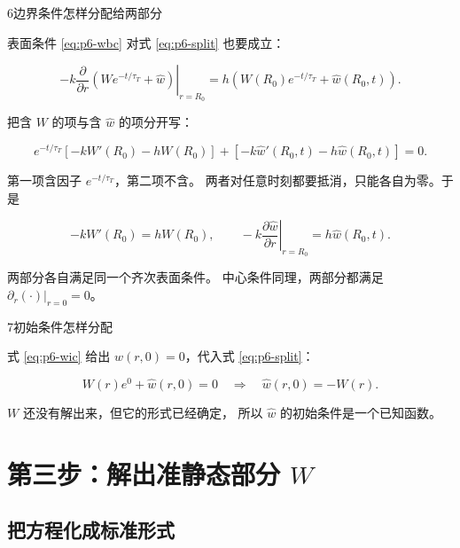 \begin{stepbox}{6}{边界条件怎样分配给两部分}

表面条件 \eqref{eq:p6-wbc} 对式 \eqref{eq:p6-split} 也要成立：

\begin{equation}
-k\left.\frac{\partial}{\partial r}\left(W e^{-t/\tau_T}+\hat w\right)\right|_{r=R_0}
=h\left(W(R_0)e^{-t/\tau_T}+\hat w(R_0,t)\right).
\end{equation}

把含 $W$ 的项与含 $\hat w$ 的项分开写：

\begin{equation}
e^{-t/\tau_T}\left[-kW'(R_0)-hW(R_0)\right]
+\left[-k\hat w'(R_0,t)-h\hat w(R_0,t)\right]=0 .
\end{equation}

第一项含因子 $e^{-t/\tau_T}$，第二项不含。
两者对任意时刻都要抵消，只能各自为零。于是

\begin{equation}
-kW'(R_0)=hW(R_0),
\qquad
-k\left.\frac{\partial\hat w}{\partial r}\right|_{r=R_0}=h\hat w(R_0,t).
\label{eq:p6-splitbc}
\end{equation}

两部分各自满足同一个齐次表面条件。
中心条件同理，两部分都满足 $\partial_r(\cdot)|_{r=0}=0$。

\end{stepbox}

\begin{stepbox}{7}{初始条件怎样分配}

式 \eqref{eq:p6-wic} 给出 $w(r,0)=0$，代入式 \eqref{eq:p6-split}：

\begin{equation}
W(r)e^{0}+\hat w(r,0)=0
\quad\Longrightarrow\quad
\hat w(r,0)=-W(r).
\label{eq:p6-splitic}
\end{equation}

$W$ 还没有解出来，但它的形式已经确定，
所以 $\hat w$ 的初始条件是一个已知函数。

\end{stepbox}

\section{第三步：解出准静态部分 $W$}

\subsection{把方程化成标准形式}

